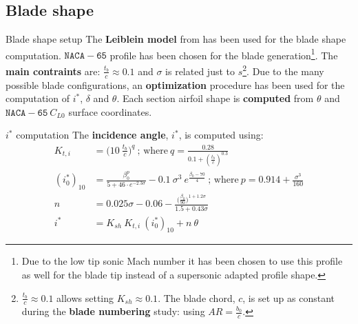 \subsection{Blade shape}
	{\nologo
	\begin{frame}{Blade shape setup}
		The \textbf{Leiblein model} from \cite[Ch. 6]{axial2004} has been used for the blade shape computation. 
		\newline 
		\newline
		$\mathtt{NACA-65}$ profile has been chosen for the blade generation\footnote{Due to the low tip sonic Mach number it has been chosen to use this profile as well for the blade tip instead of a supersonic adapted profile shape.}.
		\newline
		\newline
		The \textbf{main contraints} are: $\frac{t_b}{c} \approx 0.1$ and $\sigma$ is related just to $s$\footnote{$\frac{t_b}{c} \approx 0.1$ allows setting $K_{sh} \approx 0.1$. The blade chord, $c$, is set up as constant during the \textbf{blade numbering} study: using $AR = \frac{b_0}{c}$.}.
		\newline
		\newline
		Due to the many possible blade configurations, an \textbf{optimization} procedure has been used for the computation of $i^{*}$, $\delta$ and $\theta$. 
		\newline
		\newline
		Each section airfoil shape is \textbf{computed} from $\theta$ and $\mathtt{NACA-65} \ C_{L0}$ surface coordinates.
	\end{frame}
	}

	\begin{frame}{$i^*$ computation}
		The \textbf{incidence angle}, $i^*$, is computed using:
		\begin{align}
			K_{t,i} & = \Bigg( 10 \ \frac{t_b}{c} \Bigg)^q \ \text{; where} \ q = \frac{0.28}{0.1 + (\frac{t_b}{c})^{0.3}} \nonumber \\ 
			(i^*_0)_{10} & = \frac{\beta_0^p}{5 + 46 \cdot e^{-2.3 \sigma}} - 0.1 \ \sigma^{3} \ e^{\frac{\beta_0 - 70}{4}} \ \text{; where} \ p = 0.914 + \frac{\sigma^3}{160} \nonumber \\
			n & = 0.025 \sigma - 0.06 - \frac{\Big(\frac{\beta_0}{90} \Big)^{1 + 1.2 \sigma}}{1.5 + 0.43 \sigma} \nonumber \\ 
			i^* & = K_{sh} \ K_{t,i} \ (i^*_0)_{10} + n \ \theta \nonumber 
		\end{align}
	\end{frame}

